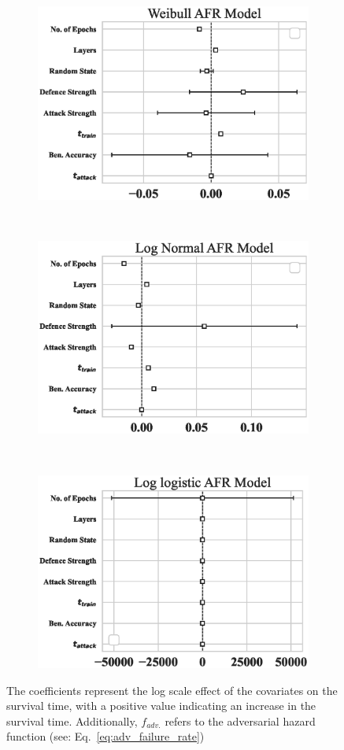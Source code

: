 \begin{figure}[!h]
    \begin{subfigure}
        \centering
        \includegraphics[width=.32\textwidth]{cifar/weibull_aft.eps}
    \end{subfigure}
    ~
    \begin{subfigure}
        \centering
        \includegraphics[width=.32\textwidth]{cifar/log_normal_aft.eps}
    \end{subfigure}
    ~
    \begin{subfigure}
        \centering
        \includegraphics[width=.32\textwidth]{cifar/log_logistic_aft.eps}
    \end{subfigure}

    \caption{The coefficients represent the log scale effect of the covariates on the survival time, with a positive value indicating an increase in the survival time. Additionally, $f_{adv.}$ refers to the adversarial hazard function (see: Eq.~\ref{eq:adv_failure_rate})}
    \label{fig:cifar_afr_models}
\end{figure}


